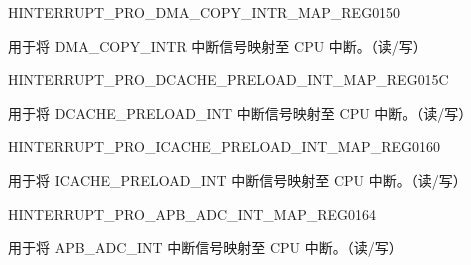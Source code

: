 \begin{register}{H}{INTERRUPT\_PRO\_DMA\_COPY\_INTR\_MAP\_REG}{\hexprefix{}0150}\label{regdesc:INTERRUPTPRODMACOPYINTRMAPREG}
%
%
\regnewline%
\begin{regdesc}\begin{reglist}
\label{fielddesc:INTERRUPTPRODMACOPYINTRMAP}\item [INTERRUPT\_PRO\_DMA\_COPY\_INTR\_MAP] 用于将 DMA\_COPY\_INTR 中断信号映射至 CPU 中断。（读/写）
\end{reglist}\end{regdesc}
\end{register}






\begin{register}{H}{INTERRUPT\_PRO\_DCACHE\_PRELOAD\_INT\_MAP\_REG}{\hexprefix{}015C}\label{regdesc:INTERRUPTPRODCACHEPRELOADINTMAPREG}
%
%
\regnewline%
\begin{regdesc}\begin{reglist}
\label{fielddesc:INTERRUPTPRODCACHEPRELOADINTMAP}\item [INTERRUPT\_PRO\_DCACHE\_PRELOAD\_INT\_MAP] 用于将 DCACHE\_PRELOAD\_INT 中断信号映射至 CPU 中断。（读/写）
\end{reglist}\end{regdesc}
\end{register}


\begin{register}{H}{INTERRUPT\_PRO\_ICACHE\_PRELOAD\_INT\_MAP\_REG}{\hexprefix{}0160}\label{regdesc:INTERRUPTPROICACHEPRELOADINTMAPREG}
%
%
\regnewline%
\begin{regdesc}\begin{reglist}
\label{fielddesc:INTERRUPTPROICACHEPRELOADINTMAP}\item [INTERRUPT\_PRO\_ICACHE\_PRELOAD\_INT\_MAP] 用于将 ICACHE\_PRELOAD\_INT 中断信号映射至 CPU 中断。（读/写）
\end{reglist}\end{regdesc}
\end{register}


\begin{register}{H}{INTERRUPT\_PRO\_APB\_ADC\_INT\_MAP\_REG}{\hexprefix{}0164}\label{regdesc:INTERRUPTPROAPBADCINTMAPREG}
%
%
\regnewline%
\begin{regdesc}\begin{reglist}
\label{fielddesc:INTERRUPTPROAPBADCINTMAP}\item [INTERRUPT\_PRO\_APB\_ADC\_INT\_MAP] 用于将 APB\_ADC\_INT 中断信号映射至 CPU 中断。（读/写）
\end{reglist}\end{regdesc}
\end{register}


